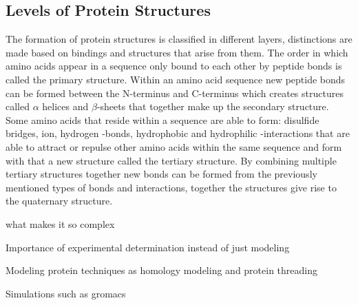 \subsection{Levels of Protein Structures}
The formation of protein structures is classified in different layers, distinctions are made based on bindings and structures that arise from them. 
The order in which amino acids appear in a sequence only bound to each other by peptide bonds is called the primary structure. 
Within an amino acid sequence new peptide bonds can be formed between the N-terminus and C-terminus which creates structures called $\alpha$ helices and $\beta$-sheets that together make up the secondary structure.
Some amino acids that reside within a sequence are able to form: disulfide bridges, ion, hydrogen -bonds, hydrophobic and hydrophilic -interactions that are able to attract or repulse other amino acids within the same sequence and form with that a new structure called the tertiary structure.
By combining multiple tertiary structures together new bonds can be formed from the previously mentioned types of bonds and interactions, together the structures give rise to the quaternary structure.

what makes it so complex 

Importance of experimental determination instead of just modeling

Modeling protein techniques as homology modeling and protein threading

Simulations such as gromacs 